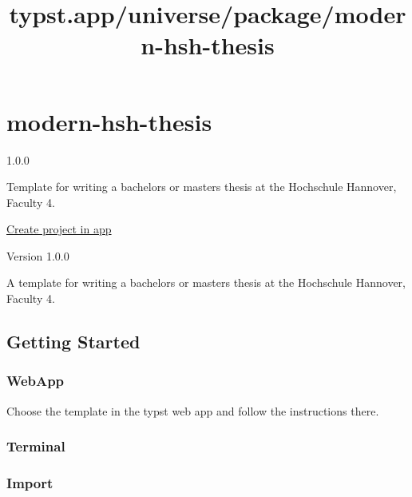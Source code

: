 \title{typst.app/universe/package/modern-hsh-thesis}

\label{banner}
\label{template-thumbnail}

\section{modern-hsh-thesis}\label{modern-hsh-thesis}

{ 1.0.0 }

Template for writing a bachelors or masters thesis at the Hochschule
Hannover, Faculty 4.

\href{/app?template=modern-hsh-thesis&version=1.0.0}{Create project in
app}

\label{readme}
Version 1.0.0

A template for writing a bachelors or masters thesis at the Hochschule
Hannover, Faculty 4.

\subsection{Getting Started}\label{getting-started}

\subsubsection{WebApp}\label{webapp}

Choose the template in the typst web app and follow the instructions
there.

\subsubsection{Terminal}\label{terminal}

\begin{Shaded}
\begin{Highlighting}[]
\end{Highlighting}
\end{Shaded}

\subsubsection{Import}\label{import}

